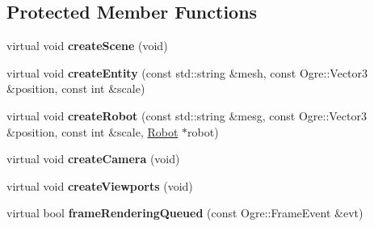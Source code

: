 \subsection*{Protected Member Functions}
\begin{DoxyCompactItemize}
\item 
virtual void {\bfseries create\+Scene} (void)\hypertarget{class_fight_window_a3aee535d7ace85acd1f0d0656d1433e0}{}\label{class_fight_window_a3aee535d7ace85acd1f0d0656d1433e0}

\item 
virtual void {\bfseries create\+Entity} (const std\+::string \&mesh, const Ogre\+::\+Vector3 \&position, const int \&scale)\hypertarget{class_fight_window_a1f6ec19b6b0bc3fe0a8036084532fc7a}{}\label{class_fight_window_a1f6ec19b6b0bc3fe0a8036084532fc7a}

\item 
virtual void {\bfseries create\+Robot} (const std\+::string \&mesg, const Ogre\+::\+Vector3 \&position, const int \&scale, \hyperlink{class_robot}{Robot} $\ast$robot)\hypertarget{class_fight_window_a535fe2c1bfff705c76aa047234f8e0e7}{}\label{class_fight_window_a535fe2c1bfff705c76aa047234f8e0e7}

\item 
virtual void {\bfseries create\+Camera} (void)\hypertarget{class_fight_window_a62b0ed087163dd1cd80cc1ed4d58853b}{}\label{class_fight_window_a62b0ed087163dd1cd80cc1ed4d58853b}

\item 
virtual void {\bfseries create\+Viewports} (void)\hypertarget{class_fight_window_a7dabb8fcaf9f3d2df3e8b5f37613603b}{}\label{class_fight_window_a7dabb8fcaf9f3d2df3e8b5f37613603b}

\item 
virtual bool {\bfseries frame\+Rendering\+Queued} (const Ogre\+::\+Frame\+Event \&evt)\hypertarget{class_fight_window_a2c83dddec520710d01f55c363f48b768}{}\label{class_fight_window_a2c83dddec520710d01f55c363f48b768}

\end{DoxyCompactItemize}
